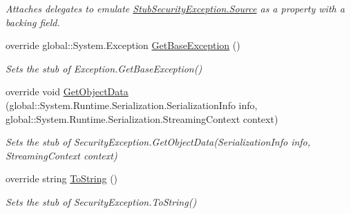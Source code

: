 \begin{DoxyCompactItemize}
\begin{DoxyCompactList}\small\item\em Attaches delegates to emulate \hyperlink{class_system_1_1_security_1_1_fakes_1_1_stub_security_exception_a30de26bb9d11a5c5863ddbfb4ff2c597}{Stub\-Security\-Exception.\-Source} as a property with a backing field.\end{DoxyCompactList}\item 
override global\-::\-System.\-Exception \hyperlink{class_system_1_1_security_1_1_fakes_1_1_stub_security_exception_a7f2597b03e70e4b61713c8784a932ad3}{Get\-Base\-Exception} ()
\begin{DoxyCompactList}\small\item\em Sets the stub of Exception.\-Get\-Base\-Exception()\end{DoxyCompactList}\item 
override void \hyperlink{class_system_1_1_security_1_1_fakes_1_1_stub_security_exception_a91d31044ae38bca2df36f0fe77f16522}{Get\-Object\-Data} (global\-::\-System.\-Runtime.\-Serialization.\-Serialization\-Info info, global\-::\-System.\-Runtime.\-Serialization.\-Streaming\-Context context)
\begin{DoxyCompactList}\small\item\em Sets the stub of Security\-Exception.\-Get\-Object\-Data(\-Serialization\-Info info, Streaming\-Context context)\end{DoxyCompactList}\item 
override string \hyperlink{class_system_1_1_security_1_1_fakes_1_1_stub_security_exception_af600e8c8a2227565176c25000ebf5454}{To\-String} ()
\begin{DoxyCompactList}\small\item\em Sets the stub of Security\-Exception.\-To\-String()\end{DoxyCompactList}\end{DoxyCompactItemize}

